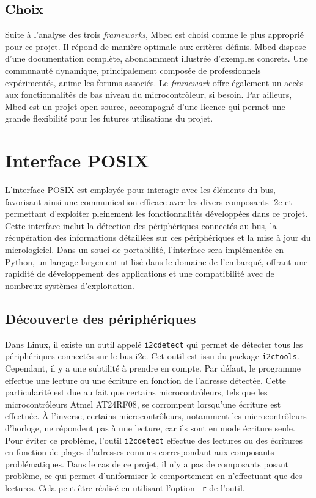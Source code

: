 \subsection{Choix}

Suite à l'analyse des trois \textit{\gls{framework}s}, Mbed est choisi comme le plus approprié pour ce projet.
Il répond de manière optimale aux critères définis.
Mbed dispose d'une documentation complète, abondamment illustrée d'exemples concrets.
Une communauté dynamique, principalement composée de professionnels expérimentés, anime les forums associés.
Le \textit{\gls{framework}} offre également un accès aux fonctionnalités de bas niveau du microcontrôleur, si besoin.
Par ailleurs, Mbed est un projet open source, accompagné d'une licence qui permet une grande flexibilité pour les futures utilisations du projet.

\section{Interface POSIX}

L'interface POSIX est employée pour interagir avec les éléments du bus, favorisant ainsi une communication efficace avec les divers composants \gls{i2c} et permettant d'exploiter pleinement les fonctionnalités développées dans ce projet.
Cette interface inclut la détection des périphériques connectés au bus, la récupération des informations détaillées sur ces périphériques et la mise à jour du micrologiciel.
Dans un souci de portabilité, l'interface sera implémentée en Python, un langage largement utilisé dans le domaine de l'embarqué, offrant une rapidité de développement des applications et une compatibilité avec de nombreux systèmes d'exploitation.

\subsection{Découverte des périphériques}

Dans Linux, il existe un outil appelé \texttt{i2cdetect} qui permet de détecter tous les périphériques connectés sur le bus \gls{i2c}.
Cet outil est issu du package \texttt{i2ctools}.
Cependant, il y a une subtilité à prendre en compte.
Par défaut, le programme effectue une lecture ou une écriture en fonction de l'adresse détectée.
Cette particularité est due au fait que certains microcontrôleurs, tels que les microcontrôleurs Atmel AT24RF08, se corrompent lorsqu'une écriture est effectuée.
À l'inverse, certains microcontrôleurs, notamment les microcontrôleurs d'horloge, ne répondent pas à une lecture, car ils sont en mode écriture seule.
Pour éviter ce problème, l'outil \texttt{i2cdetect} effectue des lectures ou des écritures en fonction de plages d'adresses connues correspondant aux composants problématiques.
Dans le cas de ce projet, il n'y a pas de composants posant problème, ce qui permet d'uniformiser le comportement en n'effectuant que des lectures.
Cela peut être réalisé en utilisant l'option \texttt{-r} de l'outil.

